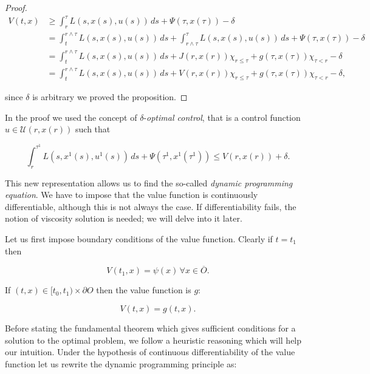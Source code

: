 \begin{proposition}
\begin{proof}
    \begin{align*}
        V(t,x) & \geq \int_r^{\tau}L(s,x(s),u(s))\,ds+\Psi(\tau,x(\tau)) - \delta \\
        & = \int_t^{r\land\tau} L(s,x(s),u(s))\,ds+\int_{r\land\tau}^{\tau} L(s,x(s),u(s))\,ds+\Psi(\tau,x(\tau)) -\delta\\
        & = \int_t^{r\land\tau} L(s,x(s),u(s))\,ds+J(r,x(r))\chi_{r\leq\tau}+g(\tau,x(\tau))\chi_{\tau<r} - \delta\\
        & = \int_t^{r\land\tau} L(s,x(s),u(s))\,ds+V(r,x(r))\chi_{r\leq\tau}+g(\tau,x(\tau))\chi_{\tau<r} - \delta,
    \end{align*}

    since $\delta$ is arbitrary we proved the proposition.
    \end{proof}
\end{proposition}


In the proof we used the concept of $\delta$-\textit{optimal control}, that is a control function $u\in\mathcal{U}(r,x(r))$ such that

\[\int_r^{\tau^1}L(s,x^1(s),u^1(s))\,ds+\Psi(\tau^1,x^1(\tau^1))\leq V(r,x(r))+\delta.\]

This new representation allows us to find the so-called \textit{dynamic programming equation}. We have to impose that the value function 
is continuously differentiable, although this is not always the case. If differentiability fails, the notion of viscosity solution is needed; we will delve into it later. 

Let us first impose boundary conditions of the value function. Clearly if $t=t_1$ then

\begin{equation}\label{1-2-boundcond1}
    V(t_1,x)=\psi(x)\,\forall x\in \overline{O}.
\end{equation}

If $(t,x)\in [t_0,t_1)\times\partial O$ then the value function is $g$:

\begin{equation}\label{1-2-boundcond2}
    V(t, x) = g(t,x).
\end{equation}

Before stating the fundamental theorem which gives sufficient conditions for a solution to the optimal problem, we follow a heuristic reasoning which will help our intuition. Under the hypothesis of continuous differentiability of the value function 
let us rewrite the dynamic programming principle as:

